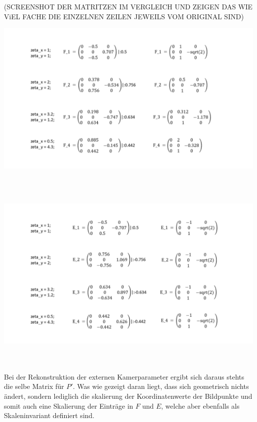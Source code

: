 (SCREENSHOT DER MATRITZEN IM VERGLEICH UND ZEIGEN DAS WIE ViEL FACHE DIE EINZELNEN ZEILEN JEWEILS VOM ORIGINAL SIND)\\

\begin{minipage}{\linewidth}
	\centering
	\includegraphics[width=1.\linewidth]{images/FundEMatrizen.png}
\end{minipage}\\ \\

\begin{minipage}{\linewidth}
	\centering
	\includegraphics[width=1.\linewidth]{images/EMatrizen.png}
\end{minipage}\\ \\

Bei der Rekonstruktion der externen Kamerparameter ergibt sich daraus stehts die selbe Matrix für $P'$. Was wie gezeigt daran liegt, dass sich geometrisch nichts ändert, sondern lediglich die skalierung der Koordinatenwerte der Bildpunkte und somit auch eine Skalierung der Einträge in $F$ und $E$, welche aber ebenfalls als Skaleninvariant definiert sind\cite{HZ}.\\

